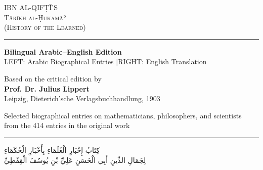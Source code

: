 \documentclass[11pt,a4paper]{article}
\def\RL#1{\beginR#1\endR}
\newcommand{\shortline}{\noindent\rule{0.5\textwidth}{0.4pt}\par}
\newcommand{\textarabic}[1]{{\arabicfont\RL{#1}}}
\begin{document}
\thispagestyle{empty}

\begin{center}
\vspace*{1.5cm}

{\LARGE\scshape IBN AL-QIFṬĪ'S}\\[0.5cm]
{\Huge\scshape Tārīkh al-Ḥukamāʾ}\\[0.8cm]
{\Large\scshape (History of the Learned)}\\[1.5cm]

\shortline
\vspace{0.5cm}

{\Large\bfseries Bilingual Arabic--English Edition}\\[0.5cm]
{\small LEFT: Arabic Biographical Entries \quad|\quad RIGHT: English Translation}\\[1.5cm]

\vspace{0.8cm}

{\normalsize Based on the critical edition by}\\[0.2cm]
{\large\bfseries Prof. Dr. Julius Lippert}\\[0.2cm]
{\small Leipzig, Dieterich'sche Verlagsbuchhandlung, 1903}\\[1.5cm]

\vspace{0.5cm}

{\small Selected biographical entries on mathematicians, philosophers, and scientists\\
from the 414 entries in the original work}\\[1cm]

\shortline

\vspace{0.5cm}
{\large\textarabic{كِتَابُ إِخْبَارِ الْعُلَمَاءِ بِأَخْبَارِ الْحُكَمَاءِ}}\\[0.3cm]
{\small\textarabic{لِجَمَالِ الدِّينِ أَبِي الْحَسَنِ عَلِيِّ بْنِ يُوسُفَ الْقِفْطِيِّ}}

\end{center}

\newpage

\tableofcontents
\newpage

\end{document}

